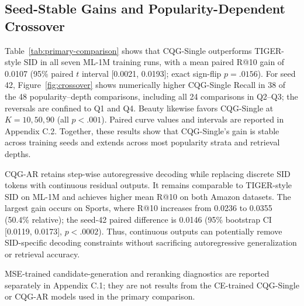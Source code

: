 \documentclass[letterpaper]{article}
\begin{document}


\subsection{Seed-Stable Gains and Popularity-Dependent Crossover}

Table~\ref{tab:primary-comparison} shows that CQG-Single outperforms
TIGER-style SID in all seven ML-1M training runs, with a mean paired R@10
gain of 0.0107 (95\% paired $t$ interval [0.0021, 0.0193]; exact sign-flip
$p=.0156$). For seed 42, Figure~\ref{fig:crossover} shows numerically higher
CQG-Single Recall in 38 of the 48 popularity--depth comparisons, including
all 24 comparisons in Q2--Q3; the reversals are confined to Q1 and Q4.
Beauty likewise favors CQG-Single at $K=10,50,90$ (all $p<.001$).
Paired curve values and intervals are reported in Appendix C.2. Together,
these results show that CQG-Single's gain is stable across training seeds
and extends across most popularity strata and retrieval depths.

CQG-AR retains step-wise autoregressive decoding while replacing discrete
SID tokens with continuous residual outputs. It remains comparable to
TIGER-style SID on ML-1M and achieves higher mean R@10 on both Amazon
datasets. The largest gain occurs on Sports, where R@10 increases from
0.0236 to 0.0355 (50.4\% relative); the seed-42 paired difference is 0.0146
(95\% bootstrap CI [0.0119, 0.0173], $p<.0002$). Thus, continuous outputs
can potentially remove SID-specific decoding constraints without sacrificing
autoregressive generalization or retrieval accuracy.

MSE-trained candidate-generation and reranking diagnostics are reported
separately in Appendix C.1; they are not results from the
CE-trained CQG-Single or CQG-AR models used in the primary comparison.
\end{document}
